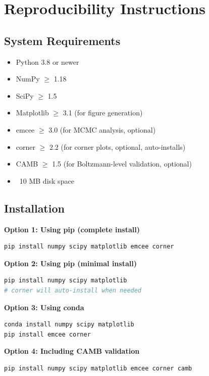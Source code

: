 \documentclass[11pt]{article}
\begin{document}
\section{Reproducibility Instructions}

\subsection{System Requirements}

\begin{itemize}
    \item Python 3.8 or newer
    \item NumPy $\geq$ 1.18
    \item SciPy $\geq$ 1.5
    \item Matplotlib $\geq$ 3.1 (for figure generation)
    \item emcee $\geq$ 3.0 (for MCMC analysis, optional)
    \item corner $\geq$ 2.2 (for corner plots, optional, auto-installs)
    \item CAMB $\geq$ 1.5 (for Boltzmann-level validation, optional)
    \item ~10 MB disk space
\end{itemize}

\subsection{Installation}

\textbf{Option 1: Using pip (complete install)}
\begin{lstlisting}[language=bash]
pip install numpy scipy matplotlib emcee corner
\end{lstlisting}

\textbf{Option 2: Using pip (minimal install)}
\begin{lstlisting}[language=bash]
pip install numpy scipy matplotlib
# corner will auto-install when needed
\end{lstlisting}

\textbf{Option 3: Using conda}
\begin{lstlisting}[language=bash]
conda install numpy scipy matplotlib
pip install emcee corner
\end{lstlisting}

\textbf{Option 4: Including CAMB validation}
\begin{lstlisting}[language=bash]
pip install numpy scipy matplotlib emcee corner camb
\end{lstlisting}
\end{document}
